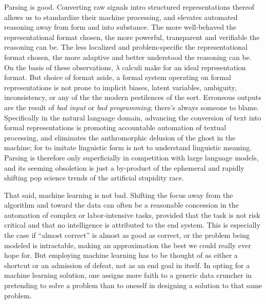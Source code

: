 Parsing is good.
Converting raw signals intro structured representations thereof allows us to standardize their machine processing, and elevates automated reasoning away from form and into substance.
The more well-behaved the representational format chosen, the more powerful, transparent and verifiable the reasoning can be.
The less localized and problem-specific the representational format chosen, the more adaptive and better understood the reasoning can be.
On the basis of these observations, $\lambda$ calculi make for an ideal representation format.
But choice of format aside, a formal system operating on formal representations is not prone to implicit biases, latent variables, ambiguity, inconsistency, or any of the the modern pestilences of the sort.
Erroneous outputs are the result of \textit{bad input} or \textit{bad programming}; there's always someone to blame.
Specifically in the natural language domain, advancing the conversion of text into formal representations is promoting accountable automation of textual processing, and eliminates the anthromorphic delusion of the ghost in the machine; for to imitate linguistic form is not to understand linguistic meaning.
Parsing is therefore only superficially in competition with large language models, and its seeming obsoletion is just a by-product of the ephemeral and rapidly shifting pop science trends of the artificial stupidity race.

That said, machine learning is not bad.
Shifting the focus away from the algorithm and toward the data can often be a reasonable concession in the automation of complex or labor-intensive tasks, provided that the task is not risk critical and that no intelligence is attributed to the end system.
This is especially the case if ``almost correct'' is almost as good as correct, or the problem being modeled is intractable, making an approximation the best we could really ever hope for.
But employing machine learning has to be thought of as either a shortcut or an admission of defeat, not as an end goal in itself.
In opting for a machine learning solution, one assigns more faith to a generic data cruncher in pretending to solve a problem than to oneself in designing a solution to that same problem.

